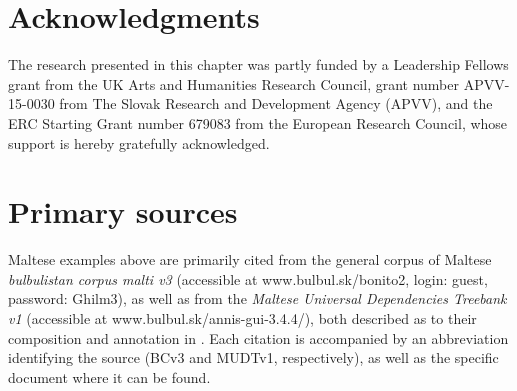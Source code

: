 \documentclass[output=paper]{langsci/langscibook}
\begin{document}
\section*{Acknowledgments}
The research presented in this chapter was partly funded by a Leadership Fellows grant from the UK Arts and Humanities Research Council, grant number APVV-15-0030 from The Slovak Research and Development Agency (APVV), and the ERC Starting Grant number 679083 from the European Research Council, whose support is hereby gratefully acknowledged.

\section*{Primary sources}
Maltese examples above are primarily cited from the general corpus of Maltese \textit{bulbulistan corpus malti v3} (accessible at www.bulbul.sk/bonito2, login: guest, password: Ghilm3), as well as from the \textit{Maltese Universal Dependencies Treebank v1} (accessible at www.bulbul.sk/annis-gui-3.4.4/), both described as to their composition and annotation in \cite{bulbul2018}. Each citation is accompanied by an abbreviation identifying the source (BCv3 and MUDTv1, respectively), as well as the specific document where it can be found.

\sloppy
\printbibliography[heading=subbibliography,notkeyword=this]
\end{document}
